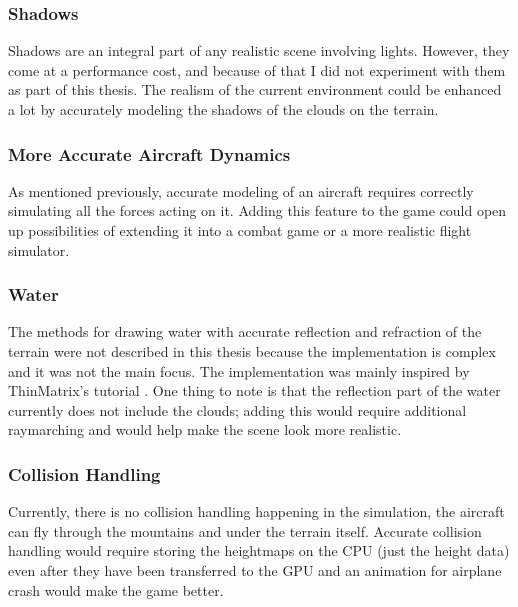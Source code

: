 \subsubsection{Shadows} Shadows are an integral part of any realistic scene involving lights. However, they come at a performance cost, and because of that I did not experiment with them as part of this thesis. The realism of the current environment could be enhanced a lot by accurately modeling the shadows of the clouds on the terrain.

\subsubsection{More Accurate Aircraft Dynamics} As mentioned previously, accurate modeling of an aircraft requires correctly simulating all the forces acting on it. Adding this feature to the game could open up possibilities of extending it into a combat game or a more realistic flight simulator.

\subsubsection{Water} The methods for drawing water with accurate reflection and refraction of the terrain were not described in this thesis because the implementation is complex and it was not the main focus. The implementation was mainly inspired by ThinMatrix's tutorial \cite{thin_matrix}. One thing to note is that the reflection part of the water currently does not include the clouds; adding this would require additional raymarching and would help make the scene look more realistic.

\subsubsection{Collision Handling} Currently, there is no collision handling happening in the simulation, the aircraft can fly through the mountains and under the terrain itself. Accurate collision handling would require storing the heightmaps on the CPU (just the height data) even after they have been transferred to the GPU and an animation for airplane crash would make the game better.